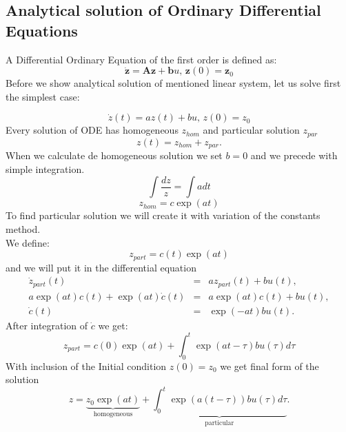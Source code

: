 \subsection{Analytical solution of Ordinary Differential Equations}\label{ana}
A Differential Ordinary Equation of the first order is defined as:
\begin{equation}
\label{eq:diff}
\dot{\mathbf{z}}= \mathbf{A}\mathbf{z} + \mathbf{b}u \texttt{, }\mathbf{z}(0) = \mathbf{z}_0
\end{equation}
Before we show analytical solution of mentioned linear system, let us solve first the simplest case\cite{SDRT2}:
 
\begin{equation}
	\dot{z}(t)= az(t) + bu \texttt{, }z(0) = z_0
\end{equation}
Every solution of ODE has homogeneous $z_{hom}$ and particular solution $z_{par}$
\begin{equation}
	z(t) = z_{hom} + z_{par}.
\end{equation}
When we calculate de homogeneous solution we set $b=0$ and we precede with simple integration.
\begin{equation}
	\int\frac{dz}{z} = \int adt
\end{equation}
\begin{equation}
	\boxed{z_{hom}= c\exp(at)}
\end{equation}
To find particular solution we will create it with variation of the constants method.\\
We define:
\begin{equation}
	z_{part}= c(t)\exp(at)
\end{equation}
and we will put it in the differential equation
\begin{eqnarray}
	\dot{z}_{part}(t)&=& az_{part}(t) + bu(t),\\
	a\exp(at)c(t)+ \exp(at)\dot{c}(t)&=& a\exp(at)c(t) + bu(t),\\
	\dot{c}(t) &=& \exp(-at)bu(t).
\end{eqnarray}
After integration of $\dot{c}$ we get:
\begin{equation}
	\boxed{z_{part}= c(0)\exp(at) + \int^t_0 \exp(at-\tau)bu(\tau)d\tau}
\end{equation}
With inclusion of the Initial condition $z(0) = z_0$ we get final form of the solution \\
\begin{equation}
	\boxed{z= \underbrace{z_0\exp(at)}_\text{homogeneous} + \underbrace{\int^t_0 \exp(a(t-\tau))bu(\tau)d\tau}_\text{particular} }.
\end{equation}
